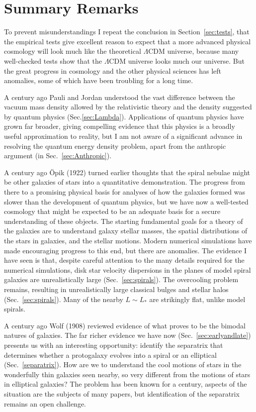 \documentclass[fleqn,12pt]{article}
\begin{document}
\section{Summary Remarks}\label{SummaryRemarks}

To prevent misunderstandings I repeat the conclusion in Section~\ref{sec:tests}, that the empirical tests give excellent reason to expect that a more advanced physical cosmology will look much like the theoretical $\Lambda$CDM universe, because many well-checked tests show that the $\Lambda$CDM universe looks much our universe. But the great progress in cosmology and the other physical sciences has left anomalies, some of which have been troubling for a long time. 

A century ago Pauli and Jordan understood the vast difference between the vacuum mass density allowed by the relativistic theory and the density suggested by quantum physics (Sec.\ref{sec:Lambda}). Applications of quantum physics have grown far broader, giving compelling evidence that this physics is a broadly useful approximation to reality, but I am not aware of a significant advance in resolving the quantum energy density problem, apart from the anthropic argument (in Sec.~\ref{sec:Anthropic}). 

A century ago \"Opik (1922) turned earlier thoughts that the spiral nebulae might be other galaxies of stars into a quantitative demonstration. The progress from there to a promising physical basis for analyses of how the galaxies formed was slower than the development of quantum physics, but we have now a well-tested cosmology that might be expected to be an adequate basis for a secure understanding of these objects. The starting fundamental goals for a theory of the galaxies are to understand galaxy stellar masses, the spatial distributions of the stars in galaxies, and the stellar motions. Modern numerical simulations have made encouraging progress to this end, but there are anomalies. The evidence I have seen is that, despite careful attention to the many details required for the numerical simulations, disk star velocity dispersions in the planes of model spiral galaxies are unrealistically large (Sec.~\ref{sec:spirals}). The overcooling problem remains, resulting in unrealistically large classical bulges and stellar halos (Sec.~\ref{sec:spirals}). Many of the nearby $L\sim L_\ast$ are strikingly flat, unlike model spirals. 

A century ago Wolf (1908) reviewed evidence of what proves to be the bimodal natures of galaxies. The far richer evidence we have now (Sec.~\ref{sec:earlyandlate}) presents us with an interesting opportunity: identify the separatrix that determines whether a protogalaxy evolves into a spiral or an elliptical (Sec.~\ref{separatrix}). How are we to understand the cool motions of stars in the wonderfully thin galaxies seen nearby, so very different from the motions of stars in elliptical galaxies? The problem has been known for a century, aspects of the situation are the subjects of many papers, but identification of the separatrix remains an open challenge.
\end{document}
